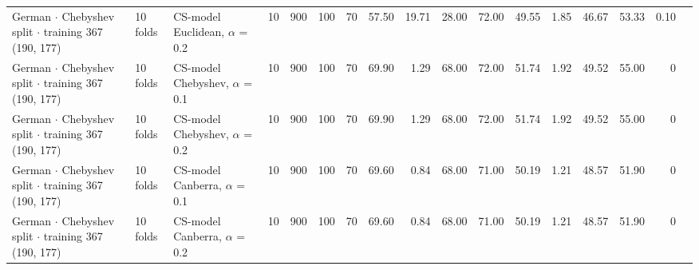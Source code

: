 \begin{longtable}{lllrrrrrrrrrrrrrl}
  German $\cdot$ Chebyshev split $\cdot$ training 367 (190, 177) & 10 folds & CS-model Euclidean, $\alpha$ = 0.2 & 10 & 900 & 100 & 70 & 57.50 & 19.71 & 28.00 & 72.00 & 49.55 & 1.85 & 46.67 & 53.33 & 0.10 &  \\
  German $\cdot$ Chebyshev split $\cdot$ training 367 (190, 177) & 10 folds & CS-model Chebyshev, $\alpha$ = 0.1 & 10 & 900 & 100 & 70 & 69.90 & 1.29 & 68.00 & 72.00 & 51.74 & 1.92 & 49.52 & 55.00 & 0 &  \\
  German $\cdot$ Chebyshev split $\cdot$ training 367 (190, 177) & 10 folds & CS-model Chebyshev, $\alpha$ = 0.2 & 10 & 900 & 100 & 70 & 69.90 & 1.29 & 68.00 & 72.00 & 51.74 & 1.92 & 49.52 & 55.00 & 0 &  \\
  German $\cdot$ Chebyshev split $\cdot$ training 367 (190, 177) & 10 folds & CS-model Canberra, $\alpha$ = 0.1 & 10 & 900 & 100 & 70 & 69.60 & 0.84 & 68.00 & 71.00 & 50.19 & 1.21 & 48.57 & 51.90 & 0 &  \\
  German $\cdot$ Chebyshev split $\cdot$ training 367 (190, 177) & 10 folds & CS-model Canberra, $\alpha$ = 0.2 & 10 & 900 & 100 & 70 & 69.60 & 0.84 & 68.00 & 71.00 & 50.19 & 1.21 & 48.57 & 51.90 & 0 &  \\
\end{longtable}
